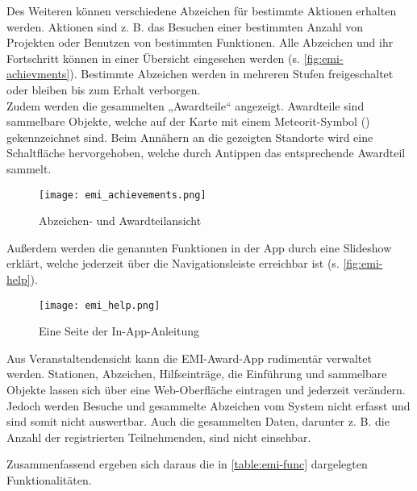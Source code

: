 Des Weiteren können verschiedene Abzeichen für bestimmte Aktionen erhalten
werden. Aktionen sind z. B. das Besuchen einer bestimmten Anzahl von Projekten
oder Benutzen von bestimmten Funktionen. Alle Abzeichen und ihr Fortschritt
können in einer Übersicht eingesehen werden (s. \autoref{fig:emi-achievments}).
Bestimmte Abzeichen werden in mehreren Stufen freigeschaltet oder bleiben bis
zum Erhalt verborgen. \\
Zudem werden die gesammelten „Awardteile“ angezeigt. Awardteile sind sammelbare
Objekte, welche auf der Karte mit einem Meteorit-Symbol
() gekennzeichnet sind. Beim Annähern an die
gezeigten Standorte wird eine Schaltfläche hervorgehoben, welche durch Antippen
das entsprechende Awardteil sammelt.

\begin{figure}[htpb]
    \centering
    \texttt{[image: emi\_achievements.png]}
    \caption{Abzeichen- und Awardteilansicht}
    \label{fig:emi-achievments}
\end{figure}

Außerdem werden die genannten Funktionen in der App durch eine Slideshow
erklärt, welche jederzeit über die Navigationsleiste erreichbar ist (s.
\autoref{fig:emi-help}).

\begin{figure}[htpb]
    \centering
    \texttt{[image: emi\_help.png]}
    \caption{Eine Seite der In-App-Anleitung}
    \label{fig:emi-help}
\end{figure}

Aus Veranstaltendensicht kann die EMI-Award-App rudimentär verwaltet
werden. Stationen, Abzeichen, Hilfseinträge, die Einführung und sammelbare
Objekte lassen sich über eine Web-Oberfläche eintragen und jederzeit verändern.
Jedoch werden Besuche und gesammelte Abzeichen vom System nicht erfasst und
sind somit nicht auswertbar. Auch die gesammelten Daten, darunter z. B. die
Anzahl der registrierten Teilnehmenden, sind nicht einsehbar.

Zusammenfassend ergeben sich daraus die in \autoref{table:emi-func} dargelegten
Funktionalitäten.

